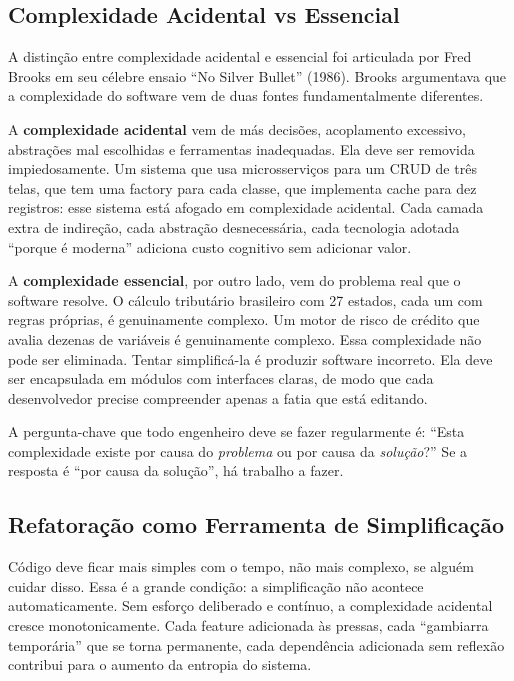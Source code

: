 \subsection{Complexidade Acidental vs Essencial}

A distinção entre complexidade acidental e essencial foi articulada por Fred
Brooks em seu célebre ensaio ``No Silver Bullet'' (1986). Brooks argumentava
que a complexidade do software vem de duas fontes fundamentalmente diferentes.

A \textbf{complexidade acidental} vem de más decisões, acoplamento excessivo,
abstrações mal escolhidas e ferramentas inadequadas. Ela deve ser removida
impiedosamente. Um sistema que usa microsserviços para um CRUD de três telas,
que tem uma factory para cada classe, que implementa cache para dez registros:
esse sistema está afogado em complexidade acidental. Cada camada extra de
indireção, cada abstração desnecessária, cada tecnologia adotada ``porque é
moderna'' adiciona custo cognitivo sem adicionar valor.

A \textbf{complexidade essencial}, por outro lado, vem do problema real que o
software resolve. O cálculo tributário brasileiro com 27 estados, cada um com
regras próprias, é genuinamente complexo. Um motor de risco de crédito que
avalia dezenas de variáveis é genuinamente complexo. Essa complexidade não pode
ser eliminada. Tentar simplificá-la é produzir software incorreto. Ela deve
ser encapsulada em módulos com interfaces claras, de modo que cada desenvolvedor
precise compreender apenas a fatia que está editando.

A pergunta-chave que todo engenheiro deve se fazer regularmente é: ``Esta
complexidade existe por causa do \emph{problema} ou por causa da
\emph{solução}?'' Se a resposta é ``por causa da solução'', há trabalho a fazer.

\subsection{Refatoração como Ferramenta de Simplificação}

Código deve ficar mais simples com o tempo, não mais complexo, se alguém
cuidar disso. Essa é a grande condição: a simplificação não acontece
automaticamente. Sem esforço deliberado e contínuo, a complexidade acidental
cresce monotonicamente. Cada feature adicionada às pressas, cada ``gambiarra
temporária'' que se torna permanente, cada dependência adicionada sem reflexão
contribui para o aumento da entropia do sistema.

